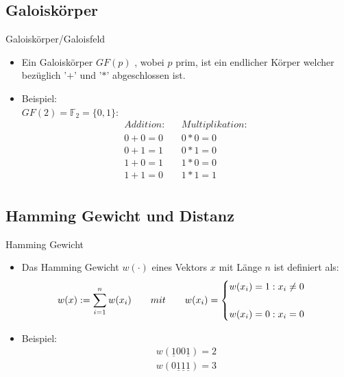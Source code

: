 \documentclass[11pt%
,aspectratio=169%
]{beamer}
\begin{document}
\subsection{Galoiskörper}
\begin{frame}{Galoiskörper/Galoisfeld}
	\begin{itemize}
		\item Ein Galoiskörper $GF(p)$ , wobei $p$ prim, ist ein endlicher Körper welcher bezüglich '$+$' und '$*$' abgeschlossen ist.\\
		\item Beispiel:\\
		   $GF(2) = \mathbb{F}_{2} = \{0,1\}$: \cite{Kunz1991}\\
		   \begin{align*}
		   Addition: && Multiplikation: \\
		    0+0=0  &&  0*0 = 0 \\
		    0+1=1  &&  0*1 = 0\\
		    1+0=1  &&  1*0 = 0\\
 		    1+1=0  &&  1*1 = 1\\
		    \end{align*}
	\end{itemize}
\end{frame}
 
\subsection{Hamming Gewicht und Distanz}
\begin{frame}{Hamming Gewicht}
	\begin{itemize}
		\item Das Hamming Gewicht $w(\cdot)$ eines Vektors $x$ mit Länge $n$ ist definiert als:
		\begin{align*}
		w(x):= \sum_{i=1}^n w(x_i) \qquad mit \qquad w(x_i) =
		\begin{cases}
		w(x_i) = 1: x_i \neq 0 \\
		& \cr w(x_i) =0 : x_i = 0
		\end{cases}
		\end{align*}
     	\item Beispiel:
     		\begin{align*}	
     		    w(\underline{1}00\underline{1})  = 2\\
     			w(0\underline{1}\underline{1}\underline{1})  = 3
     		\end{align*}
	\end{itemize}
\end{frame}
\end{document}
